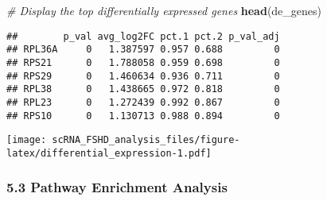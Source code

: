 \documentclass[
]{article}
\newenvironment{Shaded}{\begin{snugshade}}{\end{snugshade}}
\newcommand{\AttributeTok}[1]{\textcolor[rgb]{0.13,0.29,0.53}{#1}}
\newcommand{\CommentTok}[1]{\textcolor[rgb]{0.56,0.35,0.01}{\textit{#1}}}
\newcommand{\ConstantTok}[1]{\textcolor[rgb]{0.56,0.35,0.01}{#1}}
\newcommand{\DecValTok}[1]{\textcolor[rgb]{0.00,0.00,0.81}{#1}}
\newcommand{\FunctionTok}[1]{\textcolor[rgb]{0.13,0.29,0.53}{\textbf{#1}}}
\newcommand{\NormalTok}[1]{#1}
\newcommand{\OtherTok}[1]{\textcolor[rgb]{0.56,0.35,0.01}{#1}}
\newcommand{\SpecialCharTok}[1]{\textcolor[rgb]{0.81,0.36,0.00}{\textbf{#1}}}
\newcommand{\StringTok}[1]{\textcolor[rgb]{0.31,0.60,0.02}{#1}}
\begin{document}
\begin{Shaded}
\begin{Highlighting}[]
\CommentTok{\# Display the top differentially expressed genes}
\FunctionTok{head}\NormalTok{(de\_genes)}
\end{Highlighting}
\end{Shaded}

\begin{verbatim}
##        p_val avg_log2FC pct.1 pct.2 p_val_adj
## RPL36A     0   1.387597 0.957 0.688         0
## RPS21      0   1.788058 0.959 0.698         0
## RPS29      0   1.460634 0.936 0.711         0
## RPL38      0   1.438665 0.972 0.818         0
## RPL23      0   1.272439 0.992 0.867         0
## RPS10      0   1.130713 0.988 0.894         0
\end{verbatim}

\begin{Shaded}
\end{Shaded}

\texttt{[image: scRNA\_FSHD\_analysis\_files/figure-latex/differential\_expression-1.pdf]}

\subsubsection{5.3 Pathway Enrichment
Analysis}\label{pathway-enrichment-analysis}
\end{document}
